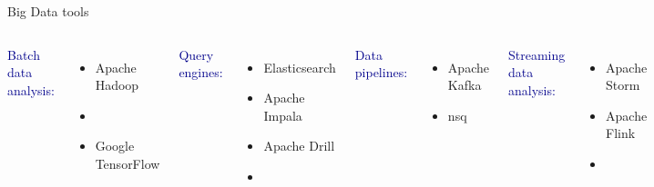 \documentclass{beamer}
\begin{document}
{
\begin{frame}{Big Data tools}
\begin{columns}

\textcolor{darkblue}{Batch data analysis:}

\begin{itemize}
\item Apache Hadoop
\item {}
\item Google TensorFlow
\end{itemize}

\textcolor{darkblue}{Query engines:}

\begin{itemize}
\item Elasticsearch
\item Apache Impala
\item Apache Drill
\item {}
\end{itemize}

\textcolor{darkblue}{Data pipelines:}

\begin{itemize}
\item Apache Kafka
\item nsq
\end{itemize}

\textcolor{darkblue}{Streaming data analysis:}

\begin{itemize}
\item Apache Storm
\item Apache Flink
\item {}
\end{itemize}


\end{columns}
\end{frame}}
\end{document}
